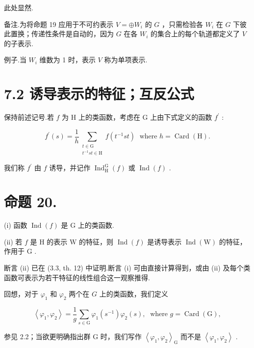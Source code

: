 \documentclass[10pt]{article}
\begin{document}
此处显然.

备注.为将命题 19 应用于不可约表示 \(V =  \oplus  {W}_{i}\) 的 \(G\) ，只需检验各 \({W}_{i}\) 在 \(G\) 下彼此置换；传递性条件是自动的，因为 \(G\) 在各 \({W}_{i}\) 的集合上的每个轨道都定义了 \(V\) 的子表示.

例子.当 \({W}_{i}\) 维数为 1 时，表示 \(V\) 称为单项表示.

\section*{7.2 诱导表示的特征；互反公式}

保持前述记号.若 \(f\) 为 \(\mathrm{H}\) 上的类函数，考虑在 \(\mathrm{G}\) 上由下式定义的函数 \({f}^{\prime }\) :

\[
{f}^{\prime }\left( s\right)  = \frac{1}{h}\mathop{\sum }\limits_{\substack{{t \in  \mathrm{G}} \\  {{t}^{-1}{st} \in  \mathrm{H}} }}f\left( {{t}^{-1}{st}}\right) \;\text{ where }h = \operatorname{Card}\left( \mathrm{H}\right) .
\]

我们称 \({f}^{\prime }\) 由 \(f\) 诱导，并记作 \({\operatorname{Ind}}_{\mathrm{H}}^{\mathrm{G}}\left( f\right)\) 或 \(\operatorname{Ind}\left( f\right)\) .

\section*{命题 20.}

(i) 函数 \(\operatorname{Ind}\left( f\right)\) 是 \(\mathrm{G}\) 上的类函数.

(ii) 若 \(f\) 是 \(\mathrm{H}\) 的表示 \(\mathrm{W}\) 的特征，则 \(\operatorname{Ind}\left( f\right)\) 是诱导表示 \(\operatorname{Ind}\left( \mathrm{W}\right)\) 的特征，作用于 \(\mathrm{G}\) .

断言 (ii) 已在 (3.3, th. 12) 中证明.断言 (i) 可由直接计算得到，或由 (ii) 及每个类函数可表示为若干特征的线性组合这一观察推得.

回想，对于 \({\varphi }_{1}\) 和 \({\varphi }_{2}\) 两个在 \(G\) 上的类函数，我们定义

\[
\left\langle  {{\varphi }_{1},{\varphi }_{2}}\right\rangle   = \frac{1}{g}\mathop{\sum }\limits_{{s \in  \mathrm{G}}}{\varphi }_{1}\left( {s}^{-1}\right) {\varphi }_{2}\left( s\right) ,\;\text{ where }g = \operatorname{Card}\left( \mathrm{G}\right) ,
\]

参见 2.2；当欲更明确指出群 G 时，我们写作 \({\left\langle  {\varphi }_{1},{\varphi }_{2}\right\rangle  }_{\mathrm{G}}\) 而不是 \(\left\langle  {{\varphi }_{1},{\varphi }_{2}}\right\rangle\) .
\end{document}
